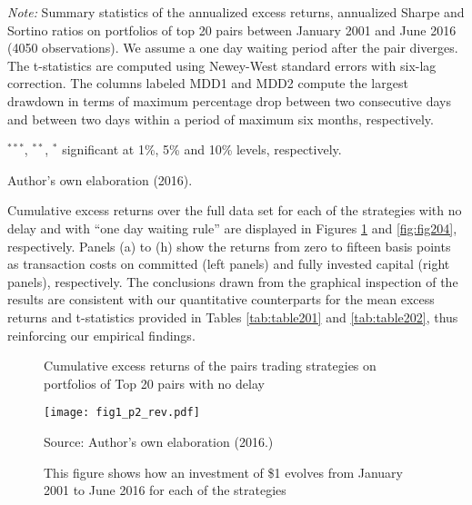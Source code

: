 \documentclass[a4paper,12pt]{report}
\begin{document}
\begin{refsection}
\begin{threeparttable}[H]
\begin{tabularx}{\textwidth}{@{\extracolsep{\fill}}llllllll@{}}
		\bottomrule
	\end{tabularx}%
	\begin{tablenotes}
		\item \textit{Note:} \scriptsize  Summary statistics of the annualized excess returns, annualized Sharpe and Sortino ratios on portfolios of top 20 pairs between January 2001 and June 2016 (4050 observations). We assume a one day waiting period after the pair diverges. The t-statistics are computed using Newey-West standard errors with six-lag correction.  The columns labeled MDD1 and MDD2 compute the largest drawdown in terms of maximum percentage drop between two consecutive days and between two days within a period of maximum six months, respectively.
		\item \scriptsize $^{\ast\ast\ast}$, $^{\ast\ast}$, $^{\ast}$  significant at 1\%, 5\% and 10\% levels, respectively.
		\item Author's own elaboration (2016).
	\end{tablenotes}
	\label{tab:table202}%
\end{threeparttable}%

\vspace{0.6cm}

\medskip

Cumulative excess returns over the full data set for each of the strategies with no delay and with ``one day waiting rule'' are displayed in Figures \ref{fig:fig203}  and \ref{fig:fig204}, respectively. Panels (a) to (h) show the returns from zero to fifteen basis points as transaction costs on committed (left panels) and fully invested capital (right panels), respectively. The conclusions drawn from the graphical inspection of the results are consistent with our quantitative counterparts for the mean excess returns and t-statistics provided in Tables \ref{tab:table201} and \ref{tab:table202}, thus reinforcing our empirical findings.\\

\begin{figure}[H]
	\centering
	\caption{Cumulative excess returns of the pairs trading strategies on portfolios of Top 20 pairs with no delay}
	\texttt{[image: fig1\_p2\_rev.pdf]}
	\captionsetup{justification=raggedright,
		singlelinecheck=false
	}
	\caption*{Source: Author's own elaboration (2016.)}
	\caption*{This figure shows how an investment of \$1 evolves from January 2001 to June 2016 for each of the strategies}
	\label{fig:fig203}
\end{figure}


\end{refsection}
\end{document}

